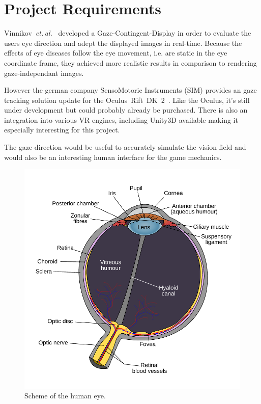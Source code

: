 \documentclass{acm_proc_article-sp}
\newcommand{\etal}{\textit{et. al.}}
\begin{document}
\section{Project Requirements}
Vinnikov \etal \cite{gazedisplays} developed a Gaze-Contingent-Display in order
to evaluate the users eye direction and adept the displayed images in real-time.
Because the effects of eye diseases follow the eye movement, i.e. are static in
the eye coordinate frame, they achieved more realistic results in comparison to
rendering gaze-independant images.

However the german company SensoMotoric Instruments (SIM) provides an gaze
tracking solution update for the Oculus Rift DK 2 \cite{smi-oculus, arstechoculus}.
Like the Oculus, it's
still under development but could probably already be purchased. There is also
an integration into various VR engines, including Unity3D available making it
especially interesting for this project.

The gaze-direction would be useful to accurately simulate the vision field
and would also be an interesting human interface for the game mechanics.

\begin{figure}
    \centering
    \includegraphics[width=\columnwidth]{human_eye_scheme.pdf}
    \caption{Scheme of the human eye.}
    \label{humaneye}
\end{figure}
\end{document}
